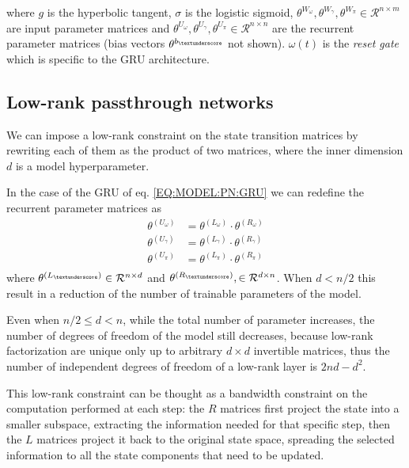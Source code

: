 \documentclass[11pt,a4paper]{article}
\begin{document}
where $g$ is the hyperbolic tangent, $\sigma$ is the logistic sigmoid, $\theta^{W_{\omega}},\theta^{W_{\gamma}},\theta^{W_{\pi}}  \in \mathcal{R}^{n \times m}$ are input parameter matrices and $\theta^{U_{\omega}},\theta^{U_{\gamma}},\theta^{U_{\pi}} \in \mathcal{R}^{n \times n}$ are the recurrent parameter matrices (bias vectors $\theta^{b_{\textunderscore}}$ not shown).
$\omega(t)$ is the \textit{reset gate} which is specific to the GRU architecture.

\subsection{Low-rank passthrough networks}
\label{SEC:MODEL:LRPN}

We can impose a low-rank constraint on the state transition matrices by rewriting each of them  as the product of two matrices, where the inner dimension $d$ is a model hyperparameter.

In the case of the GRU of eq. \ref{EQ:MODEL:PN:GRU} we can redefine the recurrent parameter matrices as
\begin{equation}
\begin{aligned}
\theta^{(U_{\omega})} &= \theta^{(L_{\omega})} \cdot \theta^{(R_{\omega})} \\
\theta^{(U_{\gamma})} &= \theta^{(L_{\gamma})} \cdot \theta^{(R_{\gamma})} \\
\theta^{(U_{\pi})}  &= \theta^{(L_{\pi})} \cdot \theta^{(R_{\pi})} \\
\end{aligned}
\label{EQ:MODEL:PN:LRGRU}
\end{equation}
where $\theta^{(L_{\textunderscore})} \in \mathcal{R}^{n \times d}$ and $\theta^{(R_{\textunderscore})}, \in \mathcal{R}^{d \times n}$. When $d < n/2$ this result in a reduction of the number of trainable parameters of the model.

Even when $n/2 \leq d < n$, while the total number of parameter increases, the number of degrees of freedom of the model still decreases, because low-rank factorization are unique only up to arbitrary $d \times d$ invertible matrices, thus the number of independent degrees of freedom of a low-rank layer is $2nd - d^2$. 

This low-rank constraint can be thought as a bandwidth constraint on the computation performed at each step: the $R$ matrices first project the state into a smaller subspace, extracting the information needed for that specific step, then the $L$ matrices project it back to the original state space, spreading the selected information to all the state components that need to be updated.
\end{document}
